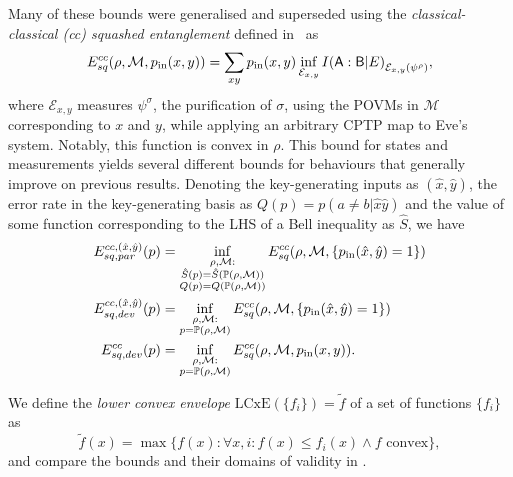 \documentclass[10pt, a4paper]{article}
\numberwithin{equation}{section} %
\theoremstyle{definition}
\theoremstyle{plain}
\newcommand{\?}{\mathrel{?}} %
\newcommand{\sM}{\mathcal{M}}
\newcommand{\cE}{\mathcal{E}}
\newcommand{\cP}{\mathbb{P}}
\newcommand{\crv}[1]{\mathsf{#1}}
\newcommand{\LCxE}[1]{\mathrm{LCxE}\left(#1\right)}
\begin{document}
      Many of these bounds were generalised and superseded using the \emph{classical-classical (cc) squashed entanglement} defined in~\cite{CCSquashedEntangle} as
      \begin{equation}
        E^{cc}_{sq}(\rho, \sM, p_{\rm in}(x,y)) = \sum_{xy} p_{\rm in}(x,y) \inf_{\cE_{x,y}} I{(\crv{A} : \crv{B}|E)}_{\cE_{x,y}(\psi^{\rho})},
      \end{equation}
      where \(\cE_{x,y}\) measures \(\psi^\sigma\), the purification of \({\sigma}\), using the POVMs in \(\sM\) corresponding to \(x\) and \(y\), while applying an arbitrary CPTP map to Eve's system. Notably, this function is convex in \(\rho\). This bound for states and measurements yields several different bounds for behaviours that generally improve on previous results. Denoting the key-generating inputs as \((\hat{x},\hat{y})\), the error rate in the key-generating basis as \(Q(p) = p(a\neq{b}|\hat{x}\hat{y})\) and the value of some function corresponding to the LHS of a Bell inequality as \(\hat{S}\), we have
      \begin{align}
        E^{cc,(\hat{x},\hat{y})}_{sq,par}(p) &= \inf_{\substack{\rho, \sM : \\ \hat{S}(p) = \hat{S}(\cP(\rho, \sM)) \\ Q(p) = Q(\cP(\rho, \sM)) }} E^{cc}_{sq}(\rho, \sM, \{p_{\rm in}(\hat{x},\hat{y})=1\}) \\
        E^{cc,(\hat{x},\hat{y})}_{sq,dev}(p) &= \inf_{\substack{\rho, \sM : \\ p = \cP(\rho, \sM)}} E^{cc}_{sq}(\rho, \sM, \{p_{\rm in}(\hat{x},\hat{y})=1\}) \\
        E^{cc}_{sq,dev}(p) &= \inf_{\substack{\rho, \sM : \\ p = \cP(\rho, \sM)}} E^{cc}_{sq}(\rho, \sM, p_{\rm in}(x,y)).
      \end{align}

      We define the \emph{lower convex envelope} \(\LCxE{\{f_i\}} = \tilde{f}\) of a set of functions \(\{f_i\}\) as
      \begin{equation}\label{eqn:LCxEdef}
        \tilde{f}(x) = \max\{ f(x) : \forall x, i : f(x) \leq f_i(x) \land f\text{ convex} \},
      \end{equation}
      and compare the bounds and their domains of validity in .
\end{document}
